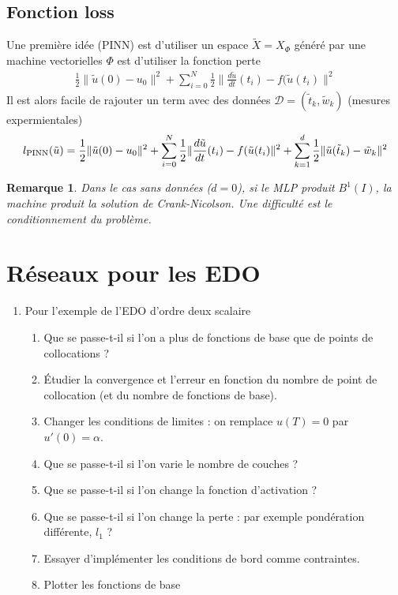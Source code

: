 \documentclass[11pt,a4paper, french]{article}
\newcommand{\norm}[1]{\|#1\|}
\newtheorem{remark}[theorem]{Remarque}
\begin{document}
\subsection{Fonction loss}\label{subsec:}
%
Une première idée  (PINN) est d'utiliser un espace $\tilde X=X_{\Phi}$ généré par une machine vectorielles $\Phi$ est d'utiliser la fonction perte
\begin{align*}
\frac12\norm{\tilde u(0)-u_0}^2 + \sum_{i=0}^N \frac12\norm{\frac{d\tilde u}{dt}(t_i) - f(\tilde u(t_i)}^2
\end{align*}
Il est alors facile de rajouter un term avec des données $\mathcal D=(\tilde t_k, \tilde w_k)$ (mesures expermientales)
\begin{align*}
l_{\rm PINN}(\tilde u) = \frac12\norm{\tilde u(0)-u_0}^2 + \sum_{i=0}^N \frac12\norm{\frac{d\tilde u}{dt}(t_i) - f(\tilde u(t_i)}^2 + \sum_{k=1}^d \frac12\norm{\tilde u(\tilde t_k) - \tilde w_k}^2
\end{align*}
%
%
\begin{remark}\label{remark:}
Dans le cas sans données ($d=0$), si le MLP produit $B^1(I)$, la machine produit la solution de Crank-Nicolson. Une difficulté est 
le conditionnement du problème.
\end{remark}
%
%
\section{Réseaux pour les EDO}\label{sec:}
%
\begin{enumerate}
\item Pour l'exemple de l'EDO d'ordre deux scalaire
\begin{enumerate}
\item Que se passe-t-il si l'on a plus de fonctions de base que de points de collocations ?
\item Étudier la convergence et l'erreur en fonction du nombre de point de collocation (et du nombre de fonctions de base).
\item Changer les conditions de limites : on remplace $u(T)=0$ par $u'(0)=\alpha$.
\item Que se passe-t-il si l'on varie le nombre de couches ?
\item Que se passe-t-il si l'on change la fonction d'activation ?
\item Que se passe-t-il si l'on change la perte : par exemple pondération différente, $l_1$ ?
\item Essayer d'implémenter les conditions de bord comme contraintes.
\item Plotter les fonctions de base
\end{enumerate}
\end{enumerate}
%
\end{document}
